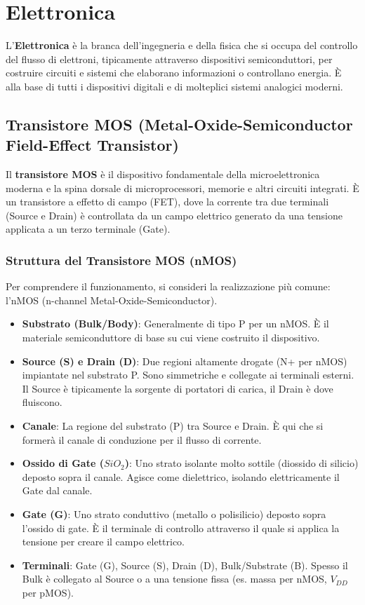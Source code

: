 \chapter{Elettronica}

L'\textbf{Elettronica} è la branca dell'ingegneria e della fisica che si occupa del controllo del flusso di elettroni, tipicamente attraverso dispositivi semiconduttori, per costruire circuiti e sistemi che elaborano informazioni o controllano energia. È alla base di tutti i dispositivi digitali e di molteplici sistemi analogici moderni.

\section{Transistore MOS (Metal-Oxide-Semiconductor Field-Effect Transistor)}
Il \textbf{transistore MOS} è il dispositivo fondamentale della microelettronica moderna e la spina dorsale di microprocessori, memorie e altri circuiti integrati. È un transistore a effetto di campo (FET), dove la corrente tra due terminali (Source e Drain) è controllata da un campo elettrico generato da una tensione applicata a un terzo terminale (Gate).

\subsection{Struttura del Transistore MOS (nMOS)}
Per comprendere il funzionamento, si consideri la realizzazione più comune: l'nMOS (n-channel Metal-Oxide-Semiconductor).
\begin{itemize}
    \item \textbf{Substrato (Bulk/Body)}: Generalmente di tipo P per un nMOS. È il materiale semiconduttore di base su cui viene costruito il dispositivo.
    \item \textbf{Source (S) e Drain (D)}: Due regioni altamente drogate (N+ per nMOS) impiantate nel substrato P. Sono simmetriche e collegate ai terminali esterni. Il Source è tipicamente la sorgente di portatori di carica, il Drain è dove fluiscono.
    \item \textbf{Canale}: La regione del substrato (P) tra Source e Drain. È qui che si formerà il canale di conduzione per il flusso di corrente.
    \item \textbf{Ossido di Gate ($SiO_2$)}: Uno strato isolante molto sottile (diossido di silicio) deposto sopra il canale. Agisce come dielettrico, isolando elettricamente il Gate dal canale.
    \item \textbf{Gate (G)}: Uno strato conduttivo (metallo o polisilicio) deposto sopra l'ossido di gate. È il terminale di controllo attraverso il quale si applica la tensione per creare il campo elettrico.
    \item \textbf{Terminali}: Gate (G), Source (S), Drain (D), Bulk/Substrate (B). Spesso il Bulk è collegato al Source o a una tensione fissa (es. massa per nMOS, $V_{DD}$ per pMOS).
\end{itemize}

